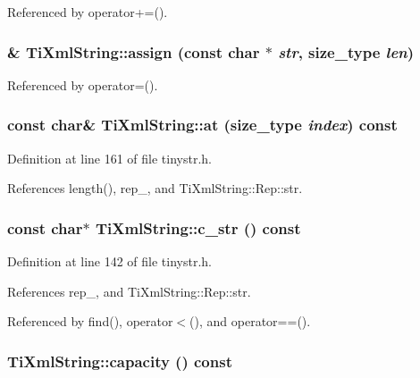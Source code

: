Referenced by operator+=().\hypertarget{class_ti_xml_string_afe4cd3452ccd7cd8c8cac16e24ea28d7}{
\subsubsection[{assign}]{\& TiXmlString::assign (const char $\ast$ {\em str}, \/  {\bf size\_\-type} {\em len})}}
\label{class_ti_xml_string_afe4cd3452ccd7cd8c8cac16e24ea28d7}


Referenced by operator=().\hypertarget{class_ti_xml_string_a6763093267bbdecbf03f8840bc349877}{
\subsubsection[{at}]{\setlength{\rightskip}{0pt plus 5cm}const char\& TiXmlString::at ({\bf size\_\-type} {\em index}) const}}
\label{class_ti_xml_string_a6763093267bbdecbf03f8840bc349877}


Definition at line 161 of file tinystr.h.

References length(), rep\_\-, and TiXmlString::Rep::str.\hypertarget{class_ti_xml_string_a5581ca641d915551d3cda90f8e7bf49b}{
\subsubsection[{c\_\-str}]{\setlength{\rightskip}{0pt plus 5cm}const char$\ast$ TiXmlString::c\_\-str () const}}
\label{class_ti_xml_string_a5581ca641d915551d3cda90f8e7bf49b}


Definition at line 142 of file tinystr.h.

References rep\_\-, and TiXmlString::Rep::str.

Referenced by find(), operator$<$(), and operator==().\hypertarget{class_ti_xml_string_a76e4d6aba7845f4cf9c02332a5fbf916}{
\subsubsection[{capacity}]{ TiXmlString::capacity () const}}
\label{class_ti_xml_string_a76e4d6aba7845f4cf9c02332a5fbf916}


